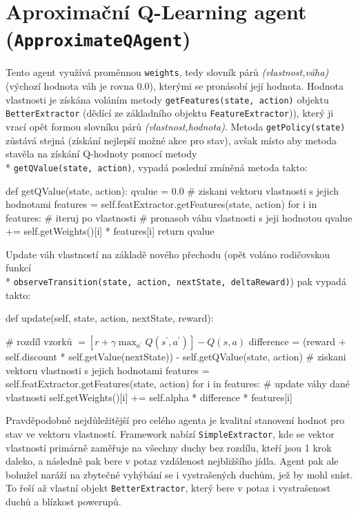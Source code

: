 \section{Aproximační Q-Learning agent (\texttt{ApproximateQAgent})}
Tento agent využívá proměnnou \texttt{weights}, tedy slovník párů \textit{(vlastnost,váha)} (výchozí hodnota váh je rovna $0.0$), kterými se pronásobí její hodnota. Hodnota vlastnosti je získána voláním metody \texttt{getFeatures(state, action)} objektu \texttt{BetterExtractor} (dědící ze základního objektu \texttt{FeatureExtractor})), který ji vrací opět formou slovníku párů \textit{(vlastnost,hodnota)}. Metoda \texttt{getPolicy(state)} zůstává stejná (získání nejlepší možné akce pro stav), avšak místo aby metoda stavěla na získání Q-hodnoty pomocí metody \\* \texttt{getQValue(state, action)}, vypadá poslední zmíněná metoda takto:
\begin{python}
def getQValue(state, action):
   qvalue = 0.0
   # ziskani vektoru vlastnosti s jejich hodnotami
   features = self.featExtractor.getFeatures(state, action)
   for i in features: # iteruj po vlastnosti
      # pronasob váhu vlastnosti s jeji hodnotou
      qvalue += self.getWeights()[i] * features[i]
   return qvalue
\end{python}
Update váh vlastností na základě nového přechodu (opět voláno rodičovskou funkcí \\* \texttt{observeTransition(state, action, nextState, deltaReward)}) pak vypadá takto:
\begin{python}
def update(self, state, action, nextState, reward):

   # rozdíl vzorků $= \left [ r + \gamma \max_{a^\prime}Q(s^\prime,a^\prime) \right]  - Q(s,a)$
   difference = (reward + self.discount * self.getValue(nextState)) 
                - self.getQValue(state, action)
   # ziskani vektoru vlastnosti s jejich hodnotami
   features = self.featExtractor.getFeatures(state, action)
   for i in features:
      # update váhy dané vlastnosti
      self.getWeights()[i] += self.alpha * difference * features[i]
\end{python}

Pravděpodobně nejdůležitější pro celého agenta je kvalitní stanovení hodnot pro stav ve vektoru vlastností. Framework nabízí \texttt{SimpleExtractor}, kde se vektor vlastností primárně zaměřuje na všechny duchy bez rozdílu, kteří jsou 1 krok daleko, a následně pak bere v potaz vzdálenost nejbližšího jídla. Agent pak ale bohužel naráží na zbytečné vyhýbání se i vystrašených duchům, jež by mohl sníst. To řeší až vlastní objekt \texttt{BetterExtractor}, který bere v potaz i vystrašenost duchů a blízkost powerupů.

